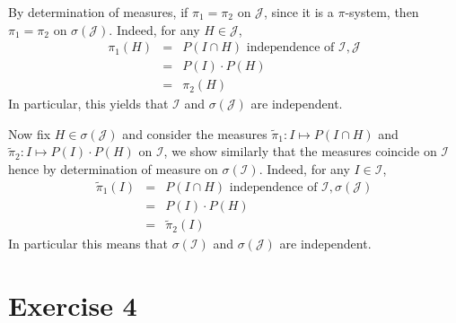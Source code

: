 \documentclass[english]{article}
\newcommand{\J}{\mathcal{J}}
\begin{document}
By determination of measures, if $\pi_1 = \pi_2$ on $\J$, since it is a $\pi$-system, then $\pi_1 = \pi_2$ on $\sigma(\J)$.
Indeed, for any $H \in \J$, 
\begin{eqnarray*}
\pi_1(H) & = & P(I \cap H) \text{ \ independence of } \mathcal{I}, \J \\ 
& = & P(I)\cdot P(H) \\
& = & \pi_2(H)
\end{eqnarray*}
In particular, this yields that $\mathcal{I}$ and $\sigma(\J)$ are independent. 

Now fix $H \in \sigma(\J)$ and consider the measures $\tilde{\pi}_1 : I \mapsto P(I \cap H)$ and $\tilde{\pi}_2 : I \mapsto P(I)\cdot P(H)$ on $\mathcal{I}$, we show similarly that the measures coincide on $\mathcal{I}$ hence by determination of measure on $\sigma(\mathcal{I})$. 
Indeed, for any $I \in \mathcal{I}$, 
\begin{eqnarray*}
\tilde{\pi}_1(I) & = & P(I \cap H) \text{ \ independence of } \mathcal{I}, \sigma(\J) \\ 
& = & P(I)\cdot P(H) \\
& = & \tilde{\pi}_2(I)
\end{eqnarray*}
In particular this means that $\sigma(\mathcal{I})$  and $\sigma(\J)$ are independent. 

\section*{Exercise 4}
\end{document}
